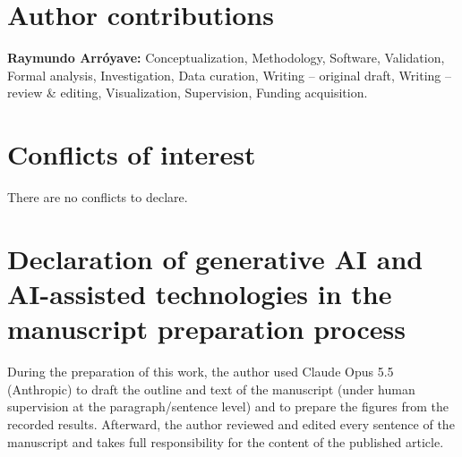 \section*{Author contributions}
\textbf{Raymundo Arróyave:} Conceptualization, Methodology, Software, Validation, Formal analysis, Investigation, Data curation, Writing -- original draft, Writing -- review \& editing, Visualization, Supervision, Funding acquisition.

\section*{Conflicts of interest}
There are no conflicts to declare.

\section*{Declaration of generative AI and AI-assisted technologies in the manuscript preparation process}
During the preparation of this work, the author used Claude Opus 5.5 (Anthropic) to draft the outline and text of the manuscript (under human supervision at the paragraph/sentence level) and to prepare the figures from the recorded results. Afterward, the author reviewed and edited every sentence of the manuscript and takes full responsibility for the content of the published article.